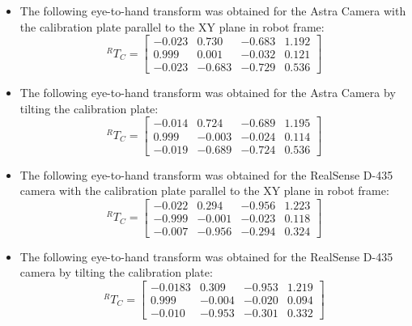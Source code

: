 \begin{itemize}
\item The following eye-to-hand transform was obtained for the Astra Camera with the calibration plate parallel to the XY plane in robot frame:
\begin{equation}
^{R}T_{C}=\begin{bmatrix} -0.023 & 0.730 & -0.683 & 1.192\\0.999 & 0.001 & -0.032 & 0.121\\ -0.023 & -0.683 & -0.729 & 0.536 \end{bmatrix}
\end{equation}

\item The following eye-to-hand transform was obtained for the Astra Camera by tilting the calibration plate:
\begin{equation}
^{R}T_{C}=\begin{bmatrix} -0.014 & 0.724 & -0.689 & 1.195\\0.999 & -0.003 & -0.024 & 0.114\\ -0.019 & -0.689 & -0.724 & 0.536 \end{bmatrix}
\end{equation}


\item The following eye-to-hand transform was obtained for the RealSense D-435 camera with the calibration plate parallel to the XY plane in robot frame:
\begin{equation}
^{R}T_{C}=\begin{bmatrix} -0.022 & 0.294 & -0.956 &1.223\\-0.999 & -0.001 & -0.023 & 0.118 \\ -0.007 & -0.956 & -0.294 & 0.324  \end{bmatrix}
\end{equation}

\item The following eye-to-hand transform was obtained for the RealSense D-435 camera by tilting the calibration plate:
\begin{equation}
^{R}T_{C}=\begin{bmatrix} -0.0183 & 0.309 &-0.953 & 1.219\\0.999& -0.004& -0.020& 0.094\\ -0.010& -0.953& -0.301& 0.332\end{bmatrix}
\end{equation}
\end{itemize}

